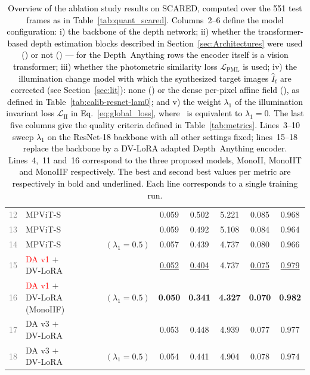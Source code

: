 \documentclass[a4paper,fleqn]{cas-dc}
\newcommand{\cmark}{\ding{51}}
\newcommand{\xmark}{\ding{55}}
\begin{document}
{\begin{table}[!t]
{\begin{tabular}{|r|l|c|c|c|c|c|c|c|c|c|}
        \textcolor{gray}{12} & MPViT-S & \cmark & \cmark & \cmark & \xmark & 0.059 & 0.502 & 5.221 & 0.085 & 0.968 \\
        \textcolor{gray}{13} & MPViT-S & \cmark & \cmark & \xmark & \xmark & 0.059 & 0.492 & 5.108 & 0.084 & 0.964 \\
        \textcolor{gray}{14} & MPViT-S & \cmark & \cmark & \xmark & \cmark $(\lambda_1 = 0.5)$ & 0.057 & 0.439 & 4.737 & 0.080 & 0.966 \\
        \hline
        \textcolor{gray}{15} & \textcolor{red}{DA v1} $+$ DV-LoRA & \cmark & \cmark & \xmark & \xmark & \underline{0.052} & \underline{0.404} & 4.737 & \underline{0.075} & \underline{0.979} \\
        \textcolor{gray}{16} & \textcolor{red}{DA v1} $+$ DV-LoRA (MonoIIF) & \cmark & \cmark & \cmark & \cmark $(\lambda_1 = 0.5)$ & \textbf{0.050} & \textbf{0.341} & \textbf{4.327} & \textbf{0.070} & \textbf{0.982}  \\
        \textcolor{gray}{17} & DA v3 $+$ DV-LoRA & \cmark & \cmark & \xmark & \xmark & 0.053 & 0.448 & 4.939 & 0.077 & 0.977  \\
        \textcolor{gray}{18} & DA v3 $+$ DV-LoRA & \cmark & \cmark & \cmark & \cmark $(\lambda_1 = 0.5)$ & 0.054 & 0.441 & 4.904 & 0.078 & 0.974 \\
        \hline
    \end{tabular}
    }
    \caption{\textcolor{black}{Overview of the ablation study results on SCARED, computed over the 551 test frames as in Table~\ref{tab:quant_scared}.
    Columns~2--6 define the model configuration: i) the backbone of the depth network; ii) whether the transformer-based depth estimation blocks described in Section~\ref{sec:Architectures} were used (\cmark) or not (\xmark) --- for the Depth~Anything rows the encoder itself is a vision transformer; iii) whether the photometric similarity loss $\mathcal{L}_\textrm{PML}$ is used; iv) the illumination change model with which the synthesized target images $\hat{I}_t$ are corrected (see Section~\ref{sec:lit}): none (\xmark) or the dense per-pixel affine field (\cmark), as defined in Table~\ref{tab:calib-resnet-lam0}; and v) the weight $\lambda_1$ of the illumination invariant loss $\mathcal{L}_\textrm{II}$ in Eq.~\eqref{eq:global_loss}, where \xmark\ is equivalent to $\lambda_1=0$.
    The last five columns give the quality criteria defined in Table~\ref{tab:metrics}.
    Lines~3--10 sweep $\lambda_1$ on the ResNet-18 backbone with all other settings fixed; lines~15--18 replace the backbone by a DV-LoRA adapted Depth~Anything encoder. Lines~4,~11 and~16 correspond to the three proposed models, MonoII, MonoIIT and MonoIIF respectively. The best and second best values per metric are respectively in bold and underlined. Each line corresponds to a single training run.}}
    \label{tab:ablation}
\end{table}
%

}
\end{document}
